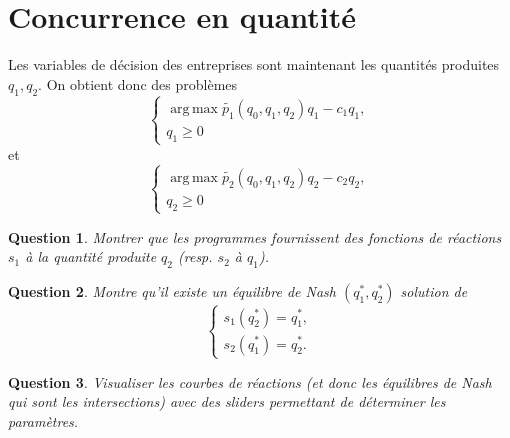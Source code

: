 \documentclass[11pt]{article}
\DeclareMathOperator*{\argmax}{arg\,max}
\newtheorem{question}{Question}
\begin{document}
\section{Concurrence en quantité}%
\label{sec:concurrence_en_quantite}

Les variables de décision des entreprises sont maintenant les quantités produites $q_1, q_2$.
On obtient donc des problèmes
\begin{equation} \label{eq:9}
    \begin{cases}
        \argmax \tilde{p_1}(q_0, q_1, q_2) q_1 - c_1 q_1,\\
        q_1 \geq 0
    \end{cases}
\end{equation}
et 
\begin{equation} \label{eq:10}
    \begin{cases}
        \argmax \tilde{p_2}(q_0, q_1, q_2) q_2 - c_2 q_2,\\
        q_2 \geq 0
    \end{cases}
\end{equation}
\begin{question}
Montrer que les programmes fournissent des fonctions de réactions $s_1$ à la quantité produite $q_2$ (resp. $s_2$ à $q_1$).
\end{question}

\begin{question}
    Montre qu'il existe un équilibre de Nash $(q_1^*, q_2^*)$ solution de 
    \begin{equation} \label{eq:11}
        \begin{cases}
            s_1(q_2^*)=q_1^*,\\
            s_2(q_1^*)=q_2^*.
        \end{cases}
    \end{equation}
\end{question}

\begin{question}
    Visualiser les courbes de réactions (et donc les équilibres de Nash qui sont les intersections) avec des sliders permettant de déterminer les paramètres.
\end{question}
\end{document}
